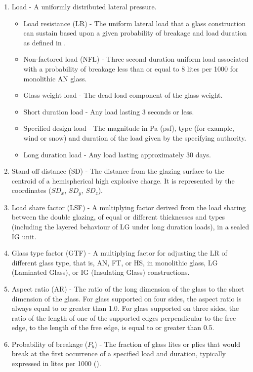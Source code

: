 \documentclass[12pt]{article}
\begin{document}
\begin{enumerate}
\begin{itemize}
\end{itemize}
\item{Load - A uniformly distributed lateral pressure.}
\begin{itemize}
\item{Load resistance (LR) - The uniform lateral load that a glass construction can sustain based upon a given probability of breakage and load duration as defined in \cite[(pp. 1 and 53)]{astm2009}.}
\item{Non-factored load (NFL) - Three second duration uniform load associated with a probability of breakage less than or equal to 8 lites per 1000 for monolithic AN glass.}
\item{Glass weight load - The dead load component of the glass weight.}
\item{Short duration load - Any load lasting 3 seconds or less.}
\item{Specified design load - The magnitude in Pa (psf), type (for example, wind or snow) and duration of the load given by the specifying authority.}
\item{Long duration load - Any load lasting approximately 30 days.}
\end{itemize}
\item{Stand off distance (SD) - The distance from the glazing surface to the centroid of a hemispherical high explosive charge. It is represented by the coordinates (${SD_{x}}$, ${SD_{y}}$, ${SD_{z}}$).}
\item{Load share factor (LSF) - A multiplying factor derived from the load sharing between the double glazing, of equal or different thicknesses and types (including the layered behaviour of LG under long duration loads), in a sealed IG unit.}
\item{Glass type factor (GTF) - A multiplying factor for adjusting the LR of different glass type, that is, AN, FT, or HS, in monolithic glass, LG (Laminated Glass), or IG (Insulating Glass) constructions.}
\item{Aspect ratio (AR) - The ratio of the long dimension of the glass to the short dimension of the glass. For glass supported on four sides, the aspect ratio is always equal to or greater than 1.0. For glass supported on three sides, the ratio of the length of one of the supported edges perpendicular to the free edge, to the length of the free edge, is equal to or greater than 0.5.}
\item{Probability of breakage (${P_{b}}$) - The fraction of glass lites or plies that would break at the first occurrence of a specified load and duration, typically expressed in lites per 1000 (\cite{astm2016}).}
\end{enumerate}
\end{document}
